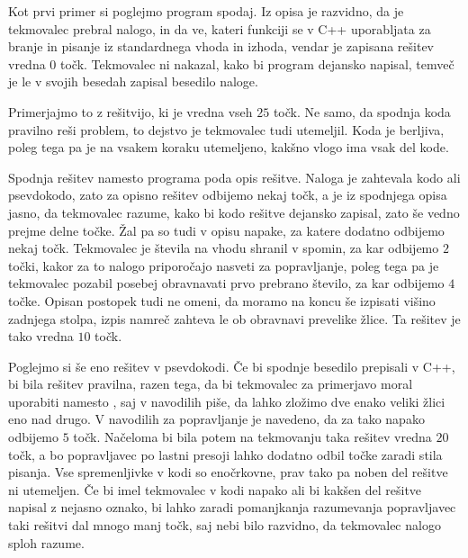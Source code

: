 
Kot prvi primer si poglejmo program spodaj.
Iz opisa je razvidno, da je tekmovalec prebral nalogo, in da ve, kateri funkciji
se v C++ uporabljata za branje in pisanje iz standardnega vhoda in izhoda,
vendar je zapisana rešitev vredna $0$ točk.
Tekmovalec ni nakazal, kako bi program dejansko napisal, temveč je le v svojih
besedah zapisal besedilo naloge.


Primerjajmo to z rešitvijo, ki je vredna vseh $25$ točk.
Ne samo, da spodnja koda pravilno reši problem, to dejstvo je tekmovalec tudi
utemeljil.
Koda je berljiva, poleg tega pa je na vsakem koraku utemeljeno, kakšno vlogo
ima vsak del kode.


Spodnja rešitev namesto programa poda opis rešitve.
Naloga je zahtevala kodo ali psevdokodo, zato za opisno rešitev odbijemo nekaj
točk, a je iz spodnjega opisa jasno, da tekmovalec razume, kako bi kodo rešitve
dejansko zapisal, zato še vedno prejme delne točke.
Žal pa so tudi v opisu napake, za katere dodatno odbijemo nekaj točk.
Tekmovalec je števila na vhodu shranil v spomin, za kar odbijemo $2$ točki,
kakor za to nalogo priporočajo nasveti za popravljanje, poleg tega pa je
tekmovalec pozabil posebej obravnavati prvo prebrano število, za kar odbijemo
$4$ točke.
Opisan postopek tudi ne omeni, da moramo na koncu še izpisati višino zadnjega
stolpa, izpis namreč zahteva le ob obravnavi prevelike žlice.
Ta rešitev je tako vredna $10$ točk.


Poglejmo si še eno rešitev v psevdokodi.
Če bi spodnje besedilo prepisali v C++, bi bila rešitev pravilna, razen tega, da
bi tekmovalec za primerjavo moral uporabiti \koda{<=} namesto \koda{<}, saj v
navodilih piše, da lahko zložimo dve enako veliki žlici eno nad drugo.
V navodilih za popravljanje je navedeno, da za tako napako odbijemo $5$ točk.
Načeloma bi bila potem na tekmovanju taka rešitev vredna $20$ točk, a bo
popravljavec po lastni presoji lahko dodatno odbil točke zaradi stila pisanja.
Vse spremenljivke v kodi so enočrkovne, prav tako pa noben del rešitve ni
utemeljen.
Če bi imel tekmovalec v kodi napako ali bi kakšen del rešitve napisal z nejasno
oznako, bi lahko zaradi pomanjkanja razumevanja popravljavec taki rešitvi dal
mnogo manj točk, saj nebi bilo razvidno, da tekmovalec nalogo sploh razume.

